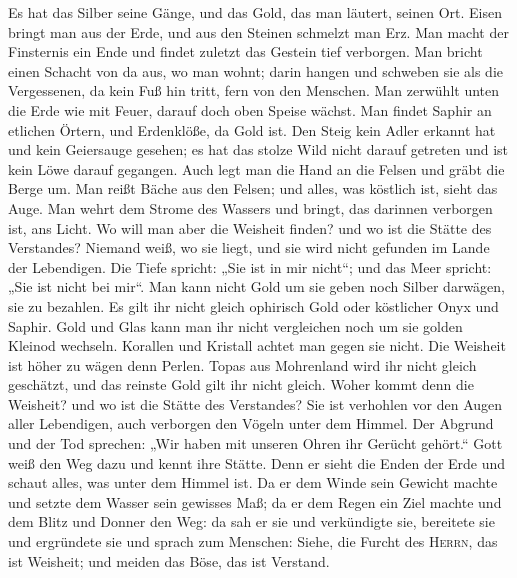  Es hat das Silber seine Gänge, und das Gold, das man
läutert, seinen Ort.  Eisen bringt man aus der Erde, und
aus den Steinen schmelzt man Erz.  Man macht der
Finsternis ein Ende und findet zuletzt das Gestein tief verborgen.
 Man bricht einen Schacht von da aus, wo man wohnt; darin
hangen und schweben sie als die Vergessenen, da kein Fuß hin tritt, fern
von den Menschen.  Man zerwühlt unten die Erde wie mit
Feuer, darauf doch oben Speise wächst.  Man findet Saphir
an etlichen Örtern, und Erdenklöße, da Gold ist.  Den
Steig kein Adler erkannt hat und kein Geiersauge gesehen; 
es hat das stolze Wild nicht darauf getreten und ist kein Löwe darauf
gegangen.  Auch legt man die Hand an die Felsen und gräbt
die Berge um.  Man reißt Bäche aus den Felsen; und alles,
was köstlich ist, sieht das Auge.  Man wehrt dem Strome
des Wassers und bringt, das darinnen verborgen ist, ans Licht.
 Wo will man aber die Weisheit finden? und wo ist die
Stätte des Verstandes?  Niemand weiß, wo sie liegt, und
sie wird nicht gefunden im Lande der Lebendigen.  Die
Tiefe spricht: „Sie ist in mir nicht``; und das Meer spricht: „Sie ist
nicht bei mir``.  Man kann nicht Gold um sie geben noch
Silber darwägen, sie zu bezahlen.  Es gilt ihr nicht
gleich ophirisch Gold oder köstlicher Onyx und Saphir. 
Gold und Glas kann man ihr nicht vergleichen noch um sie golden Kleinod
wechseln.  Korallen und Kristall achtet man gegen sie
nicht. Die Weisheit ist höher zu wägen denn Perlen. 
Topas aus Mohrenland wird ihr nicht gleich geschätzt, und das reinste
Gold gilt ihr nicht gleich.  Woher kommt denn die
Weisheit? und wo ist die Stätte des Verstandes?  Sie ist
verhohlen vor den Augen aller Lebendigen, auch verborgen den Vögeln
unter dem Himmel.  Der Abgrund und der Tod sprechen: „Wir
haben mit unseren Ohren ihr Gerücht gehört.``  Gott weiß
den Weg dazu und kennt ihre Stätte.  Denn er sieht die
Enden der Erde und schaut alles, was unter dem Himmel ist.
 Da er dem Winde sein Gewicht machte und setzte dem
Wasser sein gewisses Maß;  da er dem Regen ein Ziel
machte und dem Blitz und Donner den Weg:  da sah er sie
und verkündigte sie, bereitete sie und ergründete sie 
und sprach zum Menschen: Siehe, die Furcht des \textsc{Herrn}, das ist
Weisheit; und meiden das Böse, das ist Verstand.

